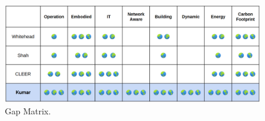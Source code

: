 \begin{figure} [!h]
\centering
\includegraphics[scale=.25]{methodology/images/gap_matrix.png}
\caption[Research Gap Matrix]{Gap Matrix.}
\label{img_gap_matrix}
\end{figure}